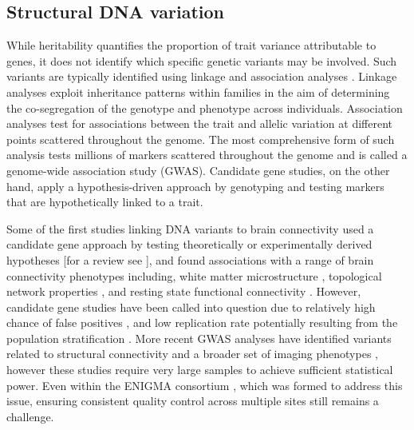 \subsection{Structural DNA variation}

While heritability quantifies the proportion of trait variance attributable to genes, it does not identify which specific genetic variants may be involved. Such variants are typically identified using linkage and association analyses \citep{Thompson2013}. Linkage analyses exploit inheritance patterns within families in the aim of determining the co-segregation of the genotype and phenotype across individuals. Association analyses test for associations between the trait and allelic variation at different points scattered throughout the genome. The most comprehensive form of such analysis tests millions of markers scattered throughout the genome and is called a genome-wide association study (GWAS). Candidate gene studies, on the other hand, apply a hypothesis-driven approach by genotyping and testing markers that are hypothetically linked to a trait. 

Some of the first studies linking DNA variants to brain connectivity used a candidate gene approach by testing theoretically or experimentally derived hypotheses [for a review see \citet{Thompson2013}], and found associations with a range of brain connectivity phenotypes including, white matter microstructure \citep{Braskie2012,Chiang2011,Jahanshad2012b}, topological network properties \citep{Dennis2011}, and resting state functional connectivity \citep{Filippini2009,Trachtenberg2012,Westlye2011}. However, candidate gene studies have been called into question due to relatively high chance of false positives \citep{Sullivan2007},  and low replication rate potentially resulting from the population stratification \citep{Hutchison2004}. More recent GWAS analyses have identified variants related to structural connectivity \citep{Chiang2009,Jahanshad2013,Jahanshad2012a} and a broader set of imaging phenotypes \citep{Elliott2018}, however these studies require very large samples to achieve sufficient statistical power. Even within the ENIGMA consortium \citep{Thompson2014}, which was formed to address this issue, ensuring consistent quality control across multiple sites still remains a challenge. 

